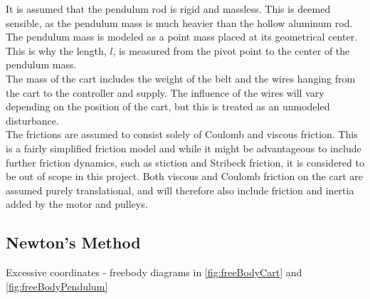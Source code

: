 It is assumed that the pendulum rod is rigid and massless. This is deemed sensible, as the pendulum mass is much heavier than the hollow aluminum rod. The pendulum mass is modeled as a point mass placed at its geometrical center. This is why the length, $l$, is measured from the pivot point to the center of the pendulum mass.\\
The mass of the cart includes the weight of the belt and the wires hanging from the cart to the controller and supply. The influence of the wires will vary depending on the position of the cart, but this is treated as an unmodeled disturbance.\\
The frictions are assumed to consist solely of Coulomb and viscous friction. This is a fairly simplified friction model and while it might be advantageous to include further friction dynamics, such as stiction and Stribeck friction, it is considered to be out of scope in this project. Both viscous and Coulomb friction on the cart are assumed purely translational, and will therefore also include friction and inertia added by the motor and pulleys.


\subsection{Newton's Method}

Excessive coordinates - freebody diagrams in \autoref{fig:freeBodyCart} and \ref{fig:freeBodyPendulum}

